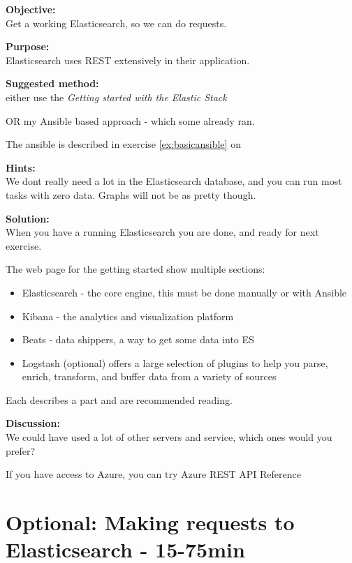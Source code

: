 \documentclass[a4paper,11pt,notitlepage]{report}
\begin{document}

{\bf Objective:}\\
Get a working Elasticsearch, so we can do requests.

{\bf Purpose:}\\
Elasticsearch uses REST extensively in their application.

{\bf Suggested method:}\\
either use the
\emph{Getting started with the Elastic Stack}

OR my Ansible based approach - which some already ran.

The ansible is described in exercise \ref{ex:basicansible} on \pageref{ex:basicansible}

{\bf Hints:}\\
We dont really need a lot in the Elasticsearch database, and you can run most tasks with zero data. Graphs will not be as pretty though.

{\bf Solution:}\\
When you have a running Elasticsearch you are done, and ready for next exercise.

The web page for the getting started show multiple sections:
\begin{itemize}
\item Elasticsearch - the core engine, this must be done manually or with Ansible
\item Kibana - the analytics and visualization platform
\item Beats - data shippers, a way to get some data into ES
\item Logstash (optional) offers a large selection of plugins to help you parse, enrich, transform, and buffer data from a variety of sources
\end{itemize}

Each describes a part and are recommended reading.

{\bf Discussion:}\\
We could have used a lot of other servers and service, which ones would you prefer?

If you have access to Azure, you can try Azure REST API Reference\\ 

\chapter{Optional: Making requests to Elasticsearch - 15-75min}
\label{ex:es-rest-api}
\end{document}
